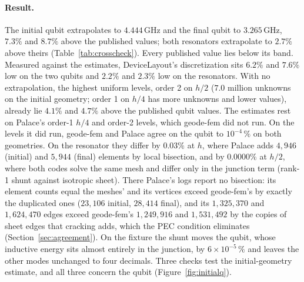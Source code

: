 \documentclass{anvil-paper}
\begin{document}
\paragraph{Result.}
The initial qubit extrapolates to $4.444$\,GHz and the final qubit to
$3.265$\,GHz, $7.3\%$ and $8.7\%$ above the published values; both
resonators extrapolate to $2.7\%$ above theirs
(Table~\ref{tab:crosscheck}). Every published value lies below its band.
Measured against the estimates, DeviceLayout's discretization sits $6.2\%$
and $7.6\%$ low on the two qubits and $2.2\%$ and $2.3\%$ low on the
resonators. With no extrapolation, the highest uniform levels, order 2
on $h/2$ ($7.0$ million unknowns on the initial geometry; order 1 on $h/4$
has more unknowns and lower values), already lie $4.1\%$ and $4.7\%$ above
the published qubit values. The estimates rest
on Palace's order-1 $h/4$ and order-2 levels, which geode-fem did not run.
On the levels it did run, geode-fem and Palace agree on the qubit to
$10^{-4}\,\%$ on both geometries. On the resonator they differ by $0.03\%$
at $h$, where Palace adds $4{,}946$ (initial) and $5{,}944$ (final)
elements by local bisection, and by $0.0000\%$ at $h/2$, where both codes
solve the same mesh and differ only in the junction term (rank-1 shunt
against isotropic sheet). There Palace's logs report no bisection: its
element counts equal the meshes' and its vertices exceed geode-fem's by
exactly the duplicated ones ($23{,}106$ initial, $28{,}414$ final), and its
$1{,}325{,}370$ and $1{,}624{,}470$ edges exceed geode-fem's $1{,}249{,}916$
and $1{,}531{,}492$ by the copies of sheet edges that cracking adds, which
the PEC condition eliminates (Section~\ref{sec:agreement}). On the fixture the shunt moves the qubit, whose
inductive energy sits almost entirely in the junction, by
$6\times10^{-5}\,\%$ and leaves the other modes unchanged to four
decimals. Three checks test the initial-geometry estimate, and all three concern
the qubit (Figure~\ref{fig:initialq}).
\end{document}
